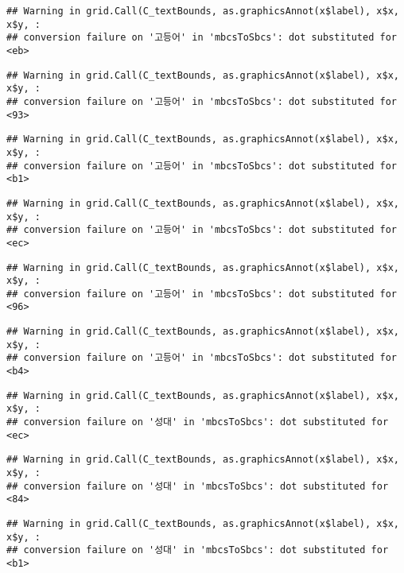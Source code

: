 \documentclass[
]{article}
\begin{document}
\begin{verbatim}
## Warning in grid.Call(C_textBounds, as.graphicsAnnot(x$label), x$x, x$y, :
## conversion failure on '고등어' in 'mbcsToSbcs': dot substituted for <eb>
\end{verbatim}

\begin{verbatim}
## Warning in grid.Call(C_textBounds, as.graphicsAnnot(x$label), x$x, x$y, :
## conversion failure on '고등어' in 'mbcsToSbcs': dot substituted for <93>
\end{verbatim}

\begin{verbatim}
## Warning in grid.Call(C_textBounds, as.graphicsAnnot(x$label), x$x, x$y, :
## conversion failure on '고등어' in 'mbcsToSbcs': dot substituted for <b1>
\end{verbatim}

\begin{verbatim}
## Warning in grid.Call(C_textBounds, as.graphicsAnnot(x$label), x$x, x$y, :
## conversion failure on '고등어' in 'mbcsToSbcs': dot substituted for <ec>
\end{verbatim}

\begin{verbatim}
## Warning in grid.Call(C_textBounds, as.graphicsAnnot(x$label), x$x, x$y, :
## conversion failure on '고등어' in 'mbcsToSbcs': dot substituted for <96>
\end{verbatim}

\begin{verbatim}
## Warning in grid.Call(C_textBounds, as.graphicsAnnot(x$label), x$x, x$y, :
## conversion failure on '고등어' in 'mbcsToSbcs': dot substituted for <b4>
\end{verbatim}

\begin{verbatim}
## Warning in grid.Call(C_textBounds, as.graphicsAnnot(x$label), x$x, x$y, :
## conversion failure on '성대' in 'mbcsToSbcs': dot substituted for <ec>
\end{verbatim}

\begin{verbatim}
## Warning in grid.Call(C_textBounds, as.graphicsAnnot(x$label), x$x, x$y, :
## conversion failure on '성대' in 'mbcsToSbcs': dot substituted for <84>
\end{verbatim}

\begin{verbatim}
## Warning in grid.Call(C_textBounds, as.graphicsAnnot(x$label), x$x, x$y, :
## conversion failure on '성대' in 'mbcsToSbcs': dot substituted for <b1>
\end{verbatim}
\end{document}
